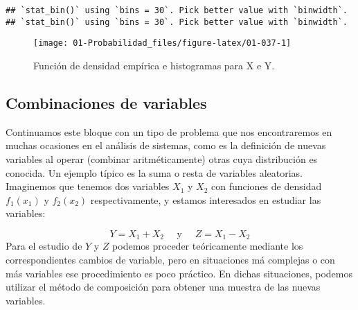 \documentclass[
]{book}
\theoremstyle{definition}
\theoremstyle{definition}
\theoremstyle{definition}
\theoremstyle{definition}
\theoremstyle{remark}
\begin{document}
\begin{verbatim}
## `stat_bin()` using `bins = 30`. Pick better value with `binwidth`.
## `stat_bin()` using `bins = 30`. Pick better value with `binwidth`.
\end{verbatim}

\begin{figure}

{\centering \texttt{[image: 01-Probabilidad\_files/figure-latex/01-037-1]} 

}

\caption{Función de densidad empírica e histogramas para X e Y.}\label{fig:01-037}
\end{figure}

\hypertarget{combinaciones-de-variables}{%
\subsection{Combinaciones de variables}\label{combinaciones-de-variables}}

Continuamos este bloque con un tipo de problema que nos encontraremos en muchas ocasiones en el análisis de sistemas, como es la definición de nuevas variables al operar (combinar aritméticamente) otras cuya distribución es conocida. Un ejemplo típico es la suma o resta de variables aleatorias. Imaginemos que tenemos dos variables \(X_1\) y \(X_2\) con funciones de densidad \(f_1(x_1)\) y \(f_2(x_2)\) respectivamente, y estamos interesados en estudiar las variables:

\[Y = X_1 + X_2 \quad\text{ y } \quad Z = X_1 - X_2\] Para el estudio de \(Y\) y \(Z\) podemos proceder teóricamente mediante los correspondientes cambios de variable, pero en situaciones má complejas o con más variables ese procedimiento es poco práctico. En dichas situaciones, podemos utilizar el método de composición para obtener una muestra de las nuevas variables.
\end{document}
